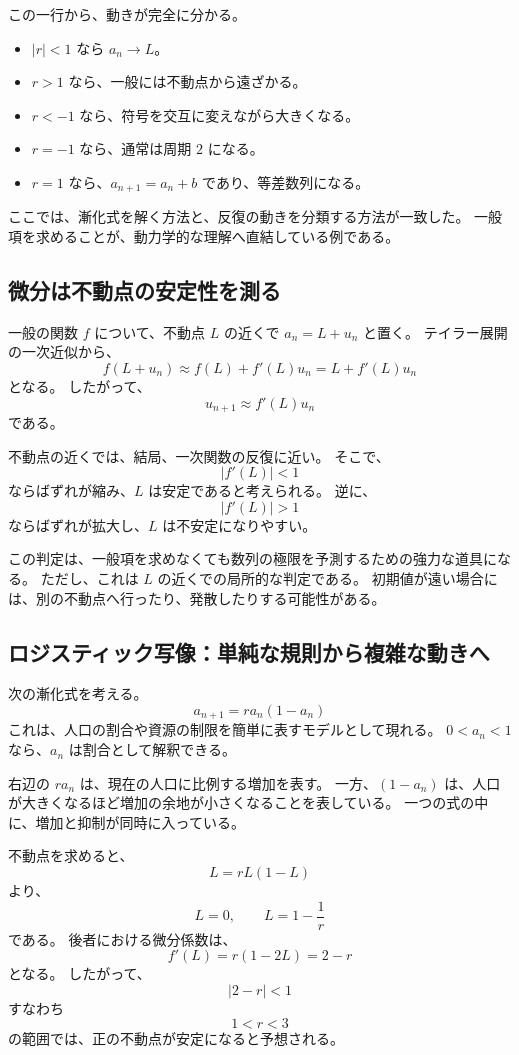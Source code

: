 この一行から、動きが完全に分かる。

\begin{itemize}
  \item $|r|<1$ なら $a_n\to L$。
  \item $r>1$ なら、一般には不動点から遠ざかる。
  \item $r<-1$ なら、符号を交互に変えながら大きくなる。
  \item $r=-1$ なら、通常は周期 $2$ になる。
  \item $r=1$ なら、$a_{n+1}=a_n+b$ であり、等差数列になる。
\end{itemize}

ここでは、漸化式を解く方法と、反復の動きを分類する方法が一致した。
一般項を求めることが、動力学的な理解へ直結している例である。

\subsection{微分は不動点の安定性を測る}

一般の関数 $f$ について、不動点 $L$ の近くで $a_n=L+u_n$ と置く。
テイラー展開の一次近似から、
\[
  f(L+u_n)
  \approx f(L)+f'(L)u_n
  =L+f'(L)u_n
\]
となる。
したがって、
\[
  u_{n+1}\approx f'(L)u_n
\]
である。

不動点の近くでは、結局、一次関数の反復に近い。
そこで、
\[
  |f'(L)|<1
\]
ならばずれが縮み、$L$ は安定であると考えられる。
逆に、
\[
  |f'(L)|>1
\]
ならばずれが拡大し、$L$ は不安定になりやすい。

この判定は、一般項を求めなくても数列の極限を予測するための強力な道具になる。
ただし、これは $L$ の近くでの局所的な判定である。
初期値が遠い場合には、別の不動点へ行ったり、発散したりする可能性がある。

\subsection{ロジスティック写像：単純な規則から複雑な動きへ}

次の漸化式を考える。
\[
  a_{n+1}=r a_n(1-a_n)
\]
これは、人口の割合や資源の制限を簡単に表すモデルとして現れる。
$0<a_n<1$ なら、$a_n$ は割合として解釈できる。

右辺の $ra_n$ は、現在の人口に比例する増加を表す。
一方、$(1-a_n)$ は、人口が大きくなるほど増加の余地が小さくなることを表している。
一つの式の中に、増加と抑制が同時に入っている。

不動点を求めると、
\[
  L=rL(1-L)
\]
より、
\[
  L=0,\qquad L=1-\frac1r
\]
である。
後者における微分係数は、
\[
  f'(L)=r(1-2L)=2-r
\]
となる。
したがって、
\[
  |2-r|<1
\]
すなわち
\[
  1<r<3
\]
の範囲では、正の不動点が安定になると予想される。

